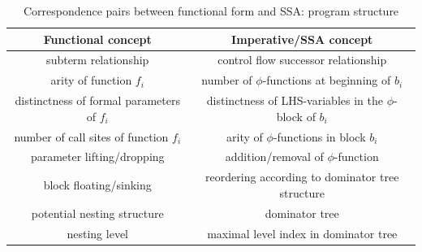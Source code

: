 \begin{table}
\begin{center}
\begin{tabular}{|c|c|}
  \hline Functional concept & Imperative/SSA concept\\ 
  \hline \hline
  subterm relationship & control flow successor relationship\\
  arity of function $f_i$ & number of
  $\phi$-functions at beginning of $b_i$\\ 
  distinctness of formal
  parameters of $f_i$ & distinctness of LHS-variables in the
  $\phi$-block of $b_i$\\ 
  number of call sites of function $f_i$ &
  arity of $\phi$-functions in block $b_i$\\ 
  parameter lifting/dropping & addition/removal of $\phi$-function\\ 
  block floating/sinking & reordering according to dominator tree
  structure\\
  potential nesting structure 
  & dominator tree\\
  nesting level & maximal
  level index in dominator tree\\
  \hline
\end{tabular}
\end{center}
\caption{\label{tableFunctionalCorrespondencesI}
  Correspondence pairs between functional form and SSA: program structure}
\end{table}


